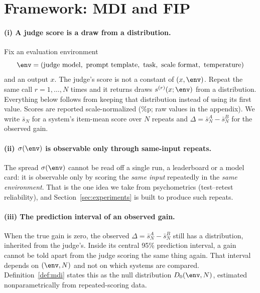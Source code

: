 \section{Framework: MDI and FIP}
\label{sec:framework}

\paragraph{(i) A judge score is a draw from a distribution.}
Fix an evaluation environment
\begin{equation*}
  \env = (\text{judge model},\ \text{prompt template},\ \text{task},\
  \text{scale format},\ \text{temperature})
\end{equation*}
and an output $x$. The judge's score is not a constant of $(x, \env)$. Repeat
the same call $r = 1, \dots, N$ times and it returns draws $s^{(r)}(x;\env)$
from a distribution. Everything below follows from keeping that distribution
instead of using its first value. Scores are reported scale-normalized (\%p;
raw values in the appendix). We write $\bar{s}_N$ for a system's item-mean
score over $N$ repeats and $\Delta = \bar{s}_N^A - \bar{s}_N^B$ for the
observed gain.

\paragraph{(ii) $\sigma(\env)$ is observable only through same-input repeats.}
The spread $\sigma(\env)$ cannot be read off a single run, a leaderboard or a
model card: it is observable only by scoring the \emph{same input} repeatedly
in the \emph{same environment}. That is the one idea we take from psychometrics
(test--retest reliability), and Section~\ref{sec:experiments} is built to
produce such repeats.

\paragraph{(iii) The prediction interval of an observed gain.}
When the true gain is zero, the observed $\Delta = \bar{s}_N^A - \bar{s}_N^B$
still has a distribution, inherited from the judge's. Inside its central 95\%
prediction interval, a gain cannot be told apart from the judge scoring the
same thing again. That interval depends on $(\env, N)$ and not on which
systems are compared. Definition~\ref{def:mdi} states this as the null
distribution $D_0(\env, N)$, estimated nonparametrically from
repeated-scoring data.

